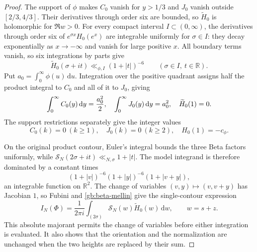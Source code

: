 \documentclass[12pt,a4paper]{amsart}
\numberwithin{equation}{section}
\def\d{\,{\rm d}}
\def\geq{\geqslant}
\theoremstyle{plain}
\theoremstyle{definition}
\theoremstyle{remark}
\begin{document}
\begin{proof}
The support of $\phi$ makes $C_0$ vanish for $y>1/3$ and $J_0$
vanish outside $[2/3,4/3]$. Their derivatives through order six are
bounded, so $\widetilde H_0$ is holomorphic for $\Re w>0$.
For every compact interval $I\subset(0,\infty)$, the derivatives
through order six of $e^{\sigma x}H_0(e^x)$ are integrable uniformly
for $\sigma\in I$: they decay exponentially as $x\to-\infty$ and
vanish for large positive $x$. All boundary terms vanish, so six
integrations by parts give
\begin{equation}\label{proof:gb:H-decay}
 \widetilde H_0(\sigma+it)\ll_{\phi,I}(1+|t|)^{-6}
 \qquad(\sigma\in I,\ t\in\mathbb R).
\end{equation}
Put $a_0=\int_0^\infty\phi(u)\,\mathrm{d}u$. Integration over the positive
quadrant assigns half the product integral to $C_0$ and all of it
to $J_0$, giving
\begin{equation}\label{gb:pole-cancellation}
 \int_0^\infty C_0(y)\d y=\frac{a_0^2}{2},
 \quad
 \int_0^\infty J_0(y)\d y=a_0^2,
 \quad\widetilde H_0(1)=0.
\end{equation}
The support restrictions separately give the integer values
\begin{equation}\label{gb:integer-values}
 C_0(k)=0\ (k\geq1),\quad
 J_0(k)=0\ (k\geq2),\quad H_0(1)=-c_\phi.
\end{equation}

On the original product contour, Euler's integral bounds the three
Beta factors uniformly, while
$\mathscr S_N(2\sigma+it)\ll_{N,\sigma}1+|t|$.
The model integrand is therefore dominated by a constant times
\[
 (1+|v|)^{-6}(1+|y|)^{-6}(1+|v+y|),
\]
an integrable function on $\mathbb R^2$. The change of variables
$(v,y)\mapsto(v,v+y)$ has Jacobian $1$, so Fubini and
\eqref{gb:beta-mellin} give the single-contour expression
\[
 I_N(\Phi)=\frac1{2\pi i}\int_{(2\sigma)}
                  \mathscr S_N(w)\widetilde H_0(w)\,\mathrm{d}w,
 \qquad w=s+z.
\]
This absolute majorant permits the change of variables before either
integration is evaluated. It also shows that the orientation and the
normalization are unchanged when the two heights are replaced by their sum.


\end{proof}
\end{document}

